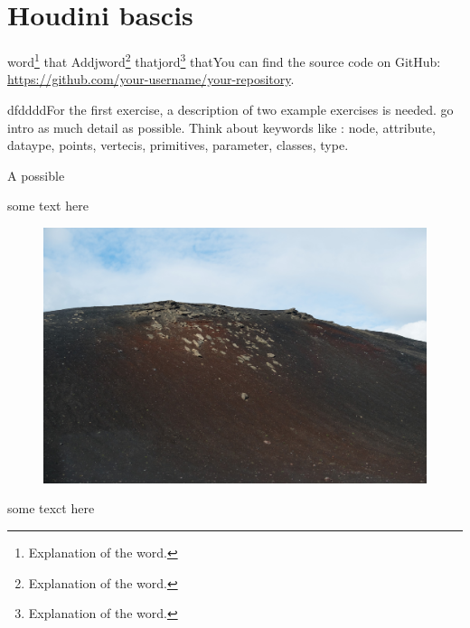 

\section*{Houdini bascis}



word\footnote{Explanation of the word.} that Addjword\footnote{Explanation of the word.} thatjord\footnote{Explanation of the word.} thatYou can find the source code on GitHub: \url{https://github.com/your-username/your-repository}.



dfddddFor the first exercise, a description of two  example exercises is needed.
go intro as much detail as possible. Think about keywords like : node, attribute, dataype, points, vertecis, primitives, parameter, classes, type.

A possible 



\begin{multicols}{2} 
some text here 
\lipsum[1-2]


	\begin{figure}[H]
	    \centering
		
		\noindent  
	    \includegraphics[width=\linewidth]{sections/assignment_1/t.png}
	\end{figure}
some texct here
\lipsum[1-2]
\end{multicols}

\lipsum[1-2]





































